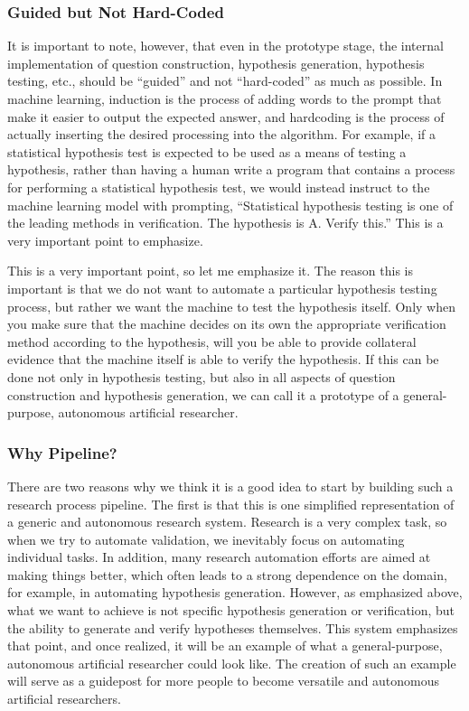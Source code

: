 \subsubsection{Guided but Not Hard-Coded}

It is important to note, however, that even in the prototype stage, the internal implementation of question construction, hypothesis generation, hypothesis testing, etc., should be ``guided'' and not ``hard-coded'' as much as possible. In machine learning, induction is the process of adding words to the prompt that make it easier to output the expected answer, and hardcoding is the process of actually inserting the desired processing into the algorithm. For example, if a statistical hypothesis test is expected to be used as a means of testing a hypothesis, rather than having a human write a program that contains a process for performing a statistical hypothesis test, we would instead instruct to the machine learning model with prompting, ``Statistical hypothesis testing is one of the leading methods in verification. The hypothesis is A. Verify this.'' This is a very important point to emphasize.

This is a very important point, so let me emphasize it. The reason this is important is that we do not want to automate a particular hypothesis testing process, but rather we want the machine to test the hypothesis itself. Only when you make sure that the machine decides on its own the appropriate verification method according to the hypothesis, will you be able to provide collateral evidence that the machine itself is able to verify the hypothesis. If this can be done not only in hypothesis testing, but also in all aspects of question construction and hypothesis generation, we can call it a prototype of a general-purpose, autonomous artificial researcher.

\subsubsection{Why Pipeline?}

There are two reasons why we think it is a good idea to start by building such a research process pipeline. The first is that this is one simplified representation of a generic and autonomous research system. Research is a very complex task, so when we try to automate validation, we inevitably focus on automating individual tasks. In addition, many research automation efforts are aimed at making things better, which often leads to a strong dependence on the domain, for example, in automating hypothesis generation. However, as emphasized above, what we want to achieve is not specific hypothesis generation or verification, but the ability to generate and verify hypotheses themselves. This system emphasizes that point, and once realized, it will be an example of what a general-purpose, autonomous artificial researcher could look like. The creation of such an example will serve as a guidepost for more people to become versatile and autonomous artificial researchers.

